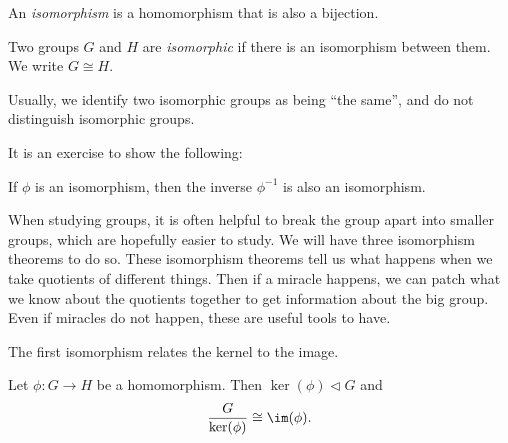 \documentclass[a4paper]{article}
\begin{document}
\begin{defi}[Isomorphism]
  An \emph{isomorphism} is a homomorphism that is also a bijection.
\end{defi}

\begin{defi}
  Two groups $G$ and $H$ are \emph{isomorphic} if there is an isomorphism between them. We write $G \cong H$.
\end{defi}
Usually, we identify two isomorphic groups as being ``the same'', and do not distinguish isomorphic groups.

It is an exercise to show the following:
\begin{lemma}
  If $\phi$ is an isomorphism, then the inverse $\phi^{-1}$ is also an isomorphism.
\end{lemma}

When studying groups, it is often helpful to break the group apart into smaller groups, which are hopefully easier to study. We will have three isomorphism theorems to do so. These isomorphism theorems tell us what happens when we take quotients of different things. Then if a miracle happens, we can patch what we know about the quotients together to get information about the big group. Even if miracles do not happen, these are useful tools to have.

The first isomorphism relates the kernel to the image.
\begin{thm}
  Let $\phi: G \to H$ be a homomorphism. Then $\ker(\phi) \lhd G$ and
  \[
    \frac{G}{\ker (\phi)} \cong \im (\phi).
  \]
\end{thm}
\end{document}
